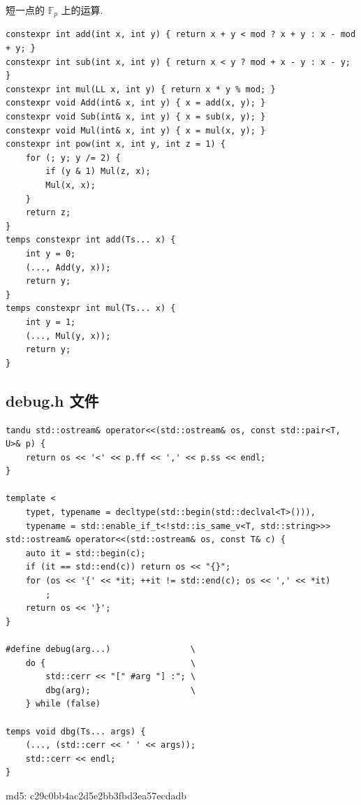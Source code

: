 \documentclass[UTF8, a4paper, titlepage, twoside]{ctexart}
\begin{document}
短一点的 $\mathbb{F}_p$ 上的运算.
\begin{lstlisting}[style=cpp]
constexpr int add(int x, int y) { return x + y < mod ? x + y : x - mod + y; }
constexpr int sub(int x, int y) { return x < y ? mod + x - y : x - y; }
constexpr int mul(LL x, int y) { return x * y % mod; }
constexpr void Add(int& x, int y) { x = add(x, y); }
constexpr void Sub(int& x, int y) { x = sub(x, y); }
constexpr void Mul(int& x, int y) { x = mul(x, y); }
constexpr int pow(int x, int y, int z = 1) {
    for (; y; y /= 2) {
        if (y & 1) Mul(z, x);
        Mul(x, x);
    }
    return z;
}
temps constexpr int add(Ts... x) {
    int y = 0;
    (..., Add(y, x));
    return y;
}
temps constexpr int mul(Ts... x) {
    int y = 1;
    (..., Mul(y, x));
    return y;
}    
\end{lstlisting}


\subsection{ debug.h 文件 }

\begin{lstlisting}[style=cpp]
tandu std::ostream& operator<<(std::ostream& os, const std::pair<T, U>& p) {
    return os << '<' << p.ff << ',' << p.ss << endl;
}

template <
    typet, typename = decltype(std::begin(std::declval<T>())),
    typename = std::enable_if_t<!std::is_same_v<T, std::string>>>
std::ostream& operator<<(std::ostream& os, const T& c) {
    auto it = std::begin(c);
    if (it == std::end(c)) return os << "{}";
    for (os << '{' << *it; ++it != std::end(c); os << ',' << *it)
        ;
    return os << '}';
}

#define debug(arg...)                \
    do {                             \
        std::cerr << "[" #arg "] :"; \
        dbg(arg);                    \
    } while (false)

temps void dbg(Ts... args) {
    (..., (std::cerr << ' ' << args));
    std::cerr << endl;
}
\end{lstlisting}

md5: c29c0bb4ac2d5e2bb3fbd3ea57ecdadb
\end{document}
